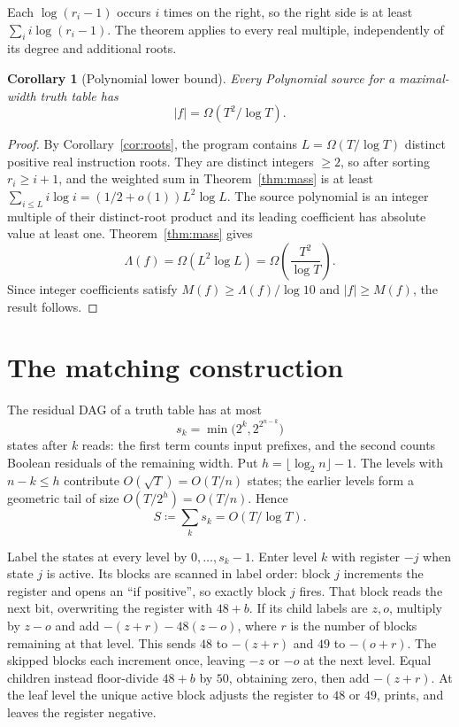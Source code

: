 \documentclass[11pt]{article}
\newtheorem{corollary}[theorem]{Corollary}
\theoremstyle{remark}
\begin{document}
Each \(\log(r_i-1)\) occurs \(i\) times on the right, so the right side is at
least \(\sum_ii\log(r_i-1)\).  The theorem applies to every real multiple,
independently of its degree and additional roots.

\begin{corollary}[Polynomial lower bound]\label{cor:lower}
Every Polynomial source for a maximal-width truth table has
\[
  |f|=\Omega(T^2/\log T).
\]
\end{corollary}

\begin{proof}
By Corollary~\ref{cor:roots}, the program contains
\(L=\Omega(T/\log T)\) distinct positive real instruction roots.  They are
distinct integers \(\ge2\), so after sorting \(r_i\ge i+1\), and the weighted
sum in Theorem~\ref{thm:mass} is at least
\(\sum_{i\le L}i\log i=(1/2+o(1))L^2\log L\).  The source polynomial
is an integer multiple of their distinct-root product and its leading
coefficient has absolute value at least one.  Theorem~\ref{thm:mass} gives
\[
 \Lambda(f)=\Omega(L^2\log L)
           =\Omega\!\left(\frac{T^2}{\log T}\right).
\]
Since integer coefficients satisfy
$M(f)\ge\Lambda(f)/\log 10$ and $|f|\ge M(f)$, the result follows.
\end{proof}


\section{The matching construction}\label{sec:upper}

The residual DAG of a truth table has at most
\[
  s_k=\min\bigl(2^k,2^{2^{n-k}}\bigr)
\]
states after $k$ reads: the first term counts input prefixes, and the second
counts Boolean residuals of the remaining width.  Put
$h=\lfloor\log_2 n\rfloor-1$.  The levels with $n-k\le h$ contribute
$O(\sqrt T)=O(T/n)$ states; the earlier levels form a geometric tail
of size $O(T/2^h)=O(T/n)$.  Hence
\[
  S\coloneqq\sum_k s_k=O(T/\log T).
\]

Label the states at every level by $0,\ldots,s_k-1$.  Enter level $k$ with
register $-j$ when state $j$ is active.  Its blocks are scanned in label
order: block $j$ increments the register and opens an ``if positive'', so
exactly block $j$ fires.  That block reads the next bit, overwriting the
register with $48+b$.  If its child labels are $z,o$, multiply by $z-o$ and
add $-(z+r)-48(z-o)$, where $r$ is the number of blocks remaining at that
level.  This sends $48$ to $-(z+r)$ and $49$ to $-(o+r)$.  The skipped blocks
each increment once, leaving $-z$ or $-o$ at the next level.  Equal children
instead floor-divide $48+b$ by $50$, obtaining zero, then add $-(z+r)$.  At
the leaf level the unique active block adjusts the register to $48$ or $49$,
prints, and leaves the register negative.
\end{document}
